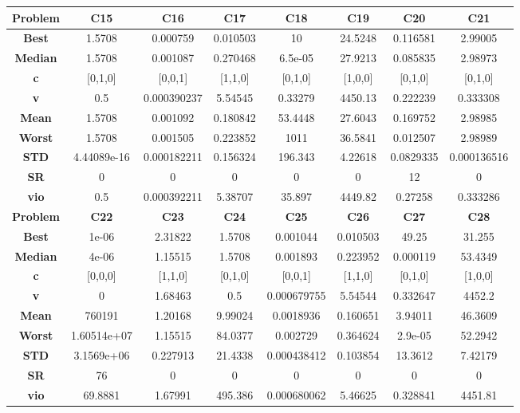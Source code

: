 \documentclass{IEEEtran}
\begin{document}
\begin{center}
\begin{tabular}{|c|c|c|c|c|c|c|c|}
    \hline 
    \hline 
    \textbf{Problem} & \textbf{C15} & \textbf{C16} & \textbf{C17} & \textbf{C18} & \textbf{C19} & \textbf{C20} & \textbf{C21} \\ 
    \hline\hline 
    \textbf{Best} & 1.5708 & 0.000759 & 0.010503 & 10 & 24.5248 & 0.116581 & 2.99005\\ 
    \textbf{Median} & 1.5708 & 0.001087 & 0.270468 & 6.5e-05 & 27.9213 & 0.085835 & 2.98973\\ 
    \textbf{c} & [0,1,0] & [0,0,1] & [1,1,0] & [0,1,0] & [1,0,0] & [0,1,0] & [0,1,0]\\ 
    \textbf{v} & 0.5 & 0.000390237 & 5.54545 & 0.33279 & 4450.13 & 0.222239 & 0.333308\\ 
    \textbf{Mean} & 1.5708 & 0.001092 & 0.180842 & 53.4448 & 27.6043 & 0.169752 & 2.98985\\ 
    \textbf{Worst} & 1.5708 & 0.001505 & 0.223852 & 1011 & 36.5841 & 0.012507 & 2.98989\\ 
    \textbf{STD} & 4.44089e-16 & 0.000182211 & 0.156324 & 196.343 & 4.22618 & 0.0829335 & 0.000136516\\ 
    \textbf{SR} & 0 & 0 & 0 & 0 & 0 & 12 & 0\\ 
    \textbf{vio} & 0.5 & 0.000392211 & 5.38707 & 35.897 & 4449.82 & 0.27258 & 0.333286\\ 
    \hline 
    \hline 
    \textbf{Problem} & \textbf{C22} & \textbf{C23} & \textbf{C24} & \textbf{C25} & \textbf{C26} & \textbf{C27} & \textbf{C28} \\ 
    \hline\hline 
    \textbf{Best} & 1e-06 & 2.31822 & 1.5708 & 0.001044 & 0.010503 & 49.25 & 31.255\\ 
    \textbf{Median} & 4e-06 & 1.15515 & 1.5708 & 0.001893 & 0.223952 & 0.000119 & 53.4349\\ 
    \textbf{c} & [0,0,0] & [1,1,0] & [0,1,0] & [0,0,1] & [1,1,0] & [0,1,0] & [1,0,0]\\ 
    \textbf{v} & 0 & 1.68463 & 0.5 & 0.000679755 & 5.54544 & 0.332647 & 4452.2\\ 
    \textbf{Mean} & 760191 & 1.20168 & 9.99024 & 0.0018936 & 0.160651 & 3.94011 & 46.3609\\ 
    \textbf{Worst} & 1.60514e+07 & 1.15515 & 84.0377 & 0.002729 & 0.364624 & 2.9e-05 & 52.2942\\ 
    \textbf{STD} & 3.1569e+06 & 0.227913 & 21.4338 & 0.000438412 & 0.103854 & 13.3612 & 7.42179\\ 
    \textbf{SR} & 76 & 0 & 0 & 0 & 0 & 0 & 0\\ 
    \textbf{vio} & 69.8881 & 1.67991 & 495.386 & 0.000680062 & 5.46625 & 0.328841 & 4451.81\\ 
    \hline 
  \end{tabular}
\end{center}
\end{document}
